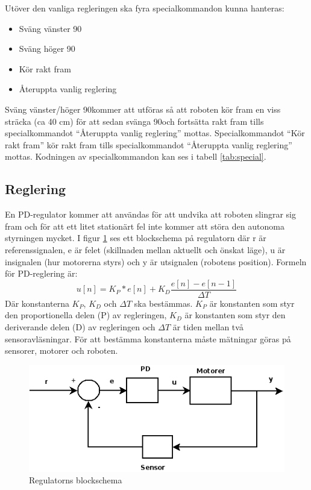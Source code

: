 Utöver den vanliga regleringen ska fyra specialkommandon kunna hanteras:
\begin{itemize}
  \item{Sväng vänster 90\degree}
  \item{Sväng höger 90\degree}
  \item{Kör rakt fram}
  \item{Återuppta vanlig reglering}
\end{itemize}

Sväng vänster/höger 90\degree  kommer att utföras så att roboten kör fram en viss sträcka (ca 40 cm) för 
att sedan svänga 90\degree  och fortsätta rakt fram tills specialkommandot ``Återuppta vanlig reglering'' mottas.
Specialkommandot ``Kör rakt fram'' kör rakt fram tills specialkommandot ``Återuppta vanlig reglering'' mottas.
Kodningen av specialkommandon kan ses i tabell \ref{tab:special}.

\subsection{Reglering}
\label{reglering}
En PD-regulator kommer att användas för att undvika att roboten slingrar sig fram och för att ett litet stationärt fel inte kommer att störa
den autonoma styrningen mycket. I figur \ref{fig:regulator} ses ett blockschema på regulatorn där r är referenssignalen,
e är felet (skillnaden mellan aktuellt och önskat läge), u är insignalen (hur motorerna styrs) och y är utsignalen (robotens position).
Formeln för PD-reglering är: $$ u[n] = K_P*e[n] + K_D\frac{e[n]-e[n-1]}{\Delta T}$$
Där konstanterna $K_P$, $K_D$ och $\Delta T$ ska bestämmas. $K_P$ är konstanten som styr den proportionella delen (P) av regleringen, 
$K_D$ är konstanten som styr den deriverande delen (D) av regleringen och $\Delta T$ är tiden mellan två sensoravläsningar. 
För att bestämma konstanterna måste mätningar göras på sensorer, motorer och roboten.

\begin{figure}[H]
  \centering
  \includegraphics[scale=0.7]{bilder/regulator.png}
  \caption{Regulatorns blockschema}
  \label{fig:regulator}
\end{figure}


